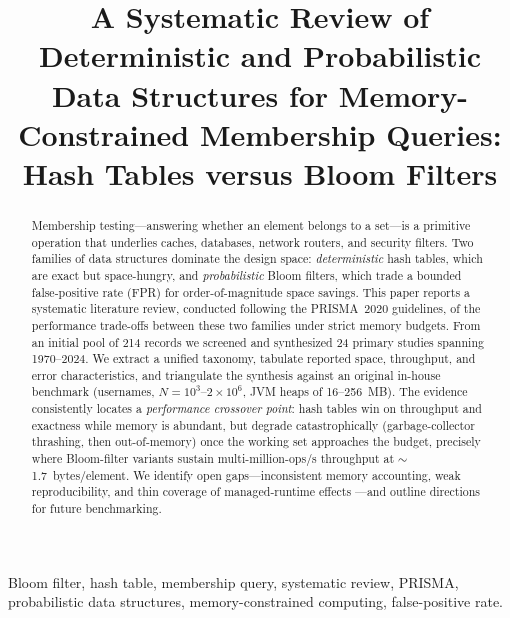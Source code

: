 \documentclass[conference]{IEEEtran}
\begin{document}
\title{A Systematic Review of Deterministic and Probabilistic Data Structures
for Memory-Constrained Membership Queries: Hash Tables versus Bloom Filters}

\author{
}

\maketitle

\begin{abstract}
Membership testing---answering whether an element belongs to a set---is a
primitive operation that underlies caches, databases, network routers, and
security filters. Two families of data structures dominate the design space:
\emph{deterministic} hash tables, which are exact but space-hungry, and
\emph{probabilistic} Bloom filters, which trade a bounded false-positive rate
(FPR) for order-of-magnitude space savings. This paper reports a systematic
literature review, conducted following the PRISMA~2020 guidelines, of the
performance trade-offs between these two families under strict memory budgets.
From an initial pool of 214 records we screened and synthesized 24 primary
studies spanning 1970--2024. We extract a unified taxonomy, tabulate reported
space, throughput, and error characteristics, and triangulate the synthesis
against an original in-house benchmark (usernames, $N=10^3$--$2\times10^6$, JVM
heaps of 16--256~MB). The evidence consistently locates a \emph{performance
crossover point}: hash tables win on throughput and exactness while memory is
abundant, but degrade catastrophically (garbage-collector thrashing, then
out-of-memory) once the working set approaches the budget, precisely where
Bloom-filter variants sustain multi-million-ops/s throughput at
$\sim$1.7~bytes/element. We identify open gaps---inconsistent memory
accounting, weak reproducibility, and thin coverage of managed-runtime effects
---and outline directions for future benchmarking.
\end{abstract}

\begin{IEEEkeywords}
Bloom filter, hash table, membership query, systematic review, PRISMA,
probabilistic data structures, memory-constrained computing, false-positive
rate.
\end{IEEEkeywords}
\end{document}
